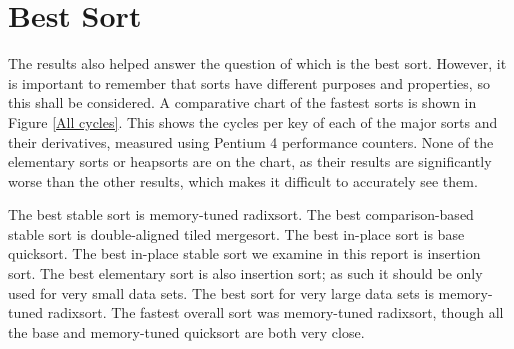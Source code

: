 \section{Best Sort}

The results also helped answer the question of which is the best sort. However,
it is important to remember that sorts have different purposes and properties,
so this shall be considered. A comparative chart of the fastest sorts is shown
in Figure \vref{All cycles}. This shows the cycles per key of each of the major
sorts and their derivatives, measured using Pentium 4 performance counters.
None of the elementary sorts or heapsorts are on the chart, as their results
are significantly worse than the other results, which makes it difficult to
accurately see them.


The best stable sort is memory-tuned radixsort. The best comparison-based stable
sort is double-aligned tiled mergesort. The best in-place sort is base
quicksort. The best in-place stable sort we examine in this report is insertion
sort. The best elementary sort is also insertion sort; as such it should be only
used for very small data sets. The best sort for very large data sets is
memory-tuned radixsort. The fastest overall sort was memory-tuned radixsort,
though all the base and memory-tuned quicksort are both very close.


